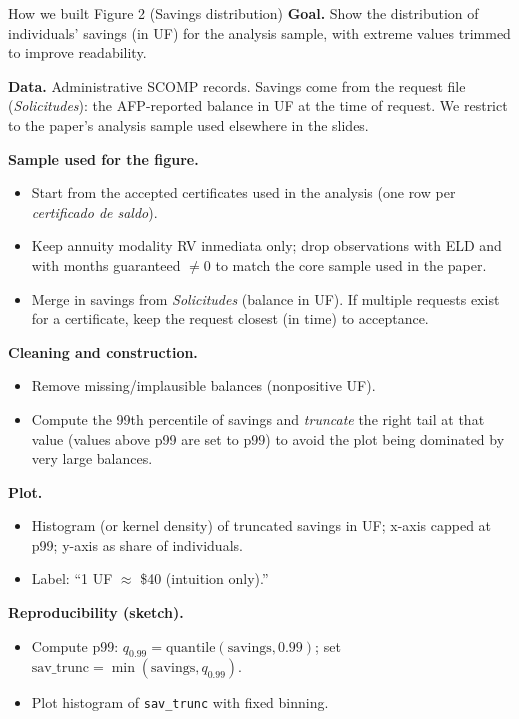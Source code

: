 \documentclass[10pt,aspectratio=169]{beamer}
\begin{document}
\begin{frame}{How we built Figure 2 (Savings distribution)}
\small
\textbf{Goal.} Show the distribution of individuals' savings (in UF) for the analysis sample, with extreme values trimmed to improve readability.

\vspace{0.6em}
\textbf{Data.} Administrative SCOMP records. Savings come from the request file (\textit{Solicitudes}): the AFP-reported balance in UF at the time of request. We restrict to the paper’s analysis sample used elsewhere in the slides.

\vspace{0.6em}
\textbf{Sample used for the figure.}
\begin{itemize}\itemsep2pt
  \item Start from the accepted certificates used in the analysis (one row per \textit{certificado de saldo}).
  \item Keep annuity modality RV inmediata only; drop observations with ELD and with months guaranteed $\neq 0$ to match the core sample used in the paper.
  \item Merge in savings from \textit{Solicitudes} (balance in UF). If multiple requests exist for a certificate, keep the request closest (in time) to acceptance.
\end{itemize}

\vspace{0.6em}
\textbf{Cleaning and construction.}
\begin{itemize}\itemsep2pt
  \item Remove missing/implausible balances (nonpositive UF).
  \item Compute the 99th percentile of savings and \emph{truncate} the right tail at that value (values above p99 are set to p99) to avoid the plot being dominated by very large balances.
\end{itemize}

\vspace{0.6em}
\textbf{Plot.}
\begin{itemize}\itemsep2pt
  \item Histogram (or kernel density) of truncated savings in UF; x-axis capped at p99; y-axis as share of individuals.
  \item Label: “1 UF $\approx$ \$40 (intuition only).”
\end{itemize}

\vspace{0.6em}
\textbf{Reproducibility (sketch).}
\begin{itemize}\itemsep2pt
  \item Compute p99: $q_{0.99} = \mathrm{quantile}(\text{savings}, 0.99)$; set $\text{sav\_trunc}=\min(\text{savings}, q_{0.99})$.
  \item Plot histogram of \texttt{sav\_trunc} with fixed binning.
\end{itemize}


\end{frame}
\end{document}
